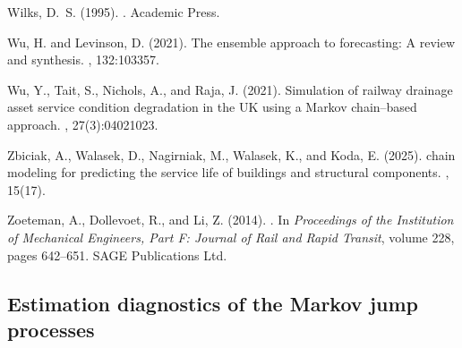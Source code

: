 \documentclass{article}
\begin{document}
\begin{thebibliography}{}
Wilks, D.~S. (1995).
.
\newblock Academic Press.

Wu, H. and Levinson, D. (2021).
\newblock The ensemble approach to forecasting: A review and synthesis.
,
  132:103357.

Wu, Y., Tait, S., Nichols, A., and Raja, J. (2021).
\newblock Simulation of railway drainage asset service condition degradation in
  the {UK} using a {Markov} chain–based approach.
, 27(3):04021023.

Zbiciak, A., Walasek, D., Nagirniak, M., Walasek, K., and Koda, E. (2025).
 chain modeling for predicting the service life of buildings
  and structural components.
, 15(17).

Zoeteman, A., Dollevoet, R., and Li, Z. (2014).
.
\newblock In {\em Proceedings of the Institution of Mechanical Engineers, Part
  F: Journal of Rail and Rapid Transit}, volume 228, pages 642--651. SAGE
  Publications Ltd.

\end{thebibliography}

\newpage
\appendix


\clearpage
\begin{landscape}

\section{Estimation diagnostics of the Markov jump processes}
\label{sec:diagnostics_estimation}

\begin{table}[h!]
\centering
\caption{Akaike information criterion (AIC; computed from the log-likelihood at the score-optimal parameters) and per-observation gradient norm of the score objective.}
\label{tab:AIC_tab}
\scriptsize

\end{table}

\end{landscape}
\clearpage
\end{document}
